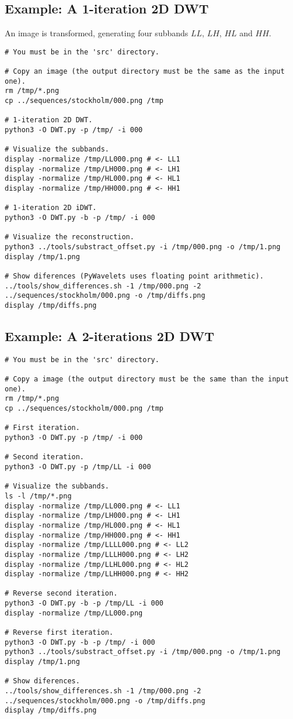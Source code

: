 \subsection*{Example: A 1-iteration 2D DWT}
An image is transformed, generating four subbands $LL$, $LH$, $HL$ and
$HH$.
\begin{verbatim}
# You must be in the 'src' directory.

# Copy an image (the output directory must be the same as the input one).
rm /tmp/*.png
cp ../sequences/stockholm/000.png /tmp

# 1-iteration 2D DWT.
python3 -O DWT.py -p /tmp/ -i 000

# Visualize the subbands.
display -normalize /tmp/LL000.png # <- LL1
display -normalize /tmp/LH000.png # <- LH1
display -normalize /tmp/HL000.png # <- HL1
display -normalize /tmp/HH000.png # <- HH1

# 1-iteration 2D iDWT.
python3 -O DWT.py -b -p /tmp/ -i 000

# Visualize the reconstruction.
python3 ../tools/substract_offset.py -i /tmp/000.png -o /tmp/1.png
display /tmp/1.png

# Show diferences (PyWavelets uses floating point arithmetic).
../tools/show_differences.sh -1 /tmp/000.png -2 ../sequences/stockholm/000.png -o /tmp/diffs.png
display /tmp/diffs.png
\end{verbatim}

\subsection*{Example: A 2-iterations 2D DWT}
\begin{verbatim}
# You must be in the 'src' directory.

# Copy a image (the output directory must be the same than the input one).
rm /tmp/*.png
cp ../sequences/stockholm/000.png /tmp

# First iteration.
python3 -O DWT.py -p /tmp/ -i 000

# Second iteration.
python3 -O DWT.py -p /tmp/LL -i 000

# Visualize the subbands.
ls -l /tmp/*.png
display -normalize /tmp/LL000.png # <- LL1  
display -normalize /tmp/LH000.png # <- LH1  
display -normalize /tmp/HL000.png # <- HL1  
display -normalize /tmp/HH000.png # <- HH1  
display -normalize /tmp/LLLL000.png # <- LL2
display -normalize /tmp/LLLH000.png # <- LH2
display -normalize /tmp/LLHL000.png # <- HL2
display -normalize /tmp/LLHH000.png # <- HH2

# Reverse second iteration.
python3 -O DWT.py -b -p /tmp/LL -i 000
display -normalize /tmp/LL000.png

# Reverse first iteration.
python3 -O DWT.py -b -p /tmp/ -i 000
python3 ../tools/substract_offset.py -i /tmp/000.png -o /tmp/1.png
display /tmp/1.png

# Show diferences.
../tools/show_differences.sh -1 /tmp/000.png -2 ../sequences/stockholm/000.png -o /tmp/diffs.png
display /tmp/diffs.png
\end{verbatim}


